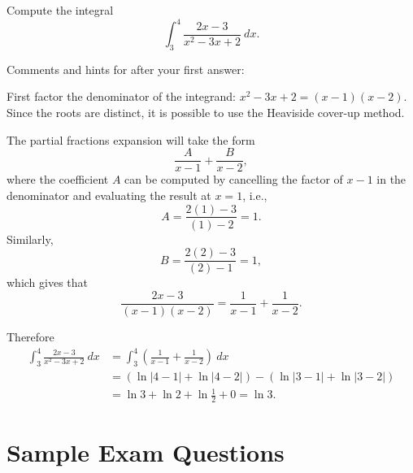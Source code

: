 \documentclass{ximera}
\begin{document}
\begin{question}%

Compute the integral
\[\int_{3}^{4}\frac{2x-3}{x^2-3x+2}~dx.\]
\begin{multiplechoice}
\end{multiplechoice}
Comments and hints for after your first answer:
\begin{feedback}
First factor the denominator of the integrand: \(x^2-3x+2 = (x-1)(x-2)\). Since the roots are distinct, it is possible to use the Heaviside cover-up method.  \begin{hint} The partial fractions expansion will take the form \[\frac{A}{x-1} + \frac{B}{x-2}, \] where the coefficient \(A\) can be computed by cancelling the factor of \(x-1\) in the denominator and evaluating the result at \(x = 1\), i.e., \[A = \frac{2(1)-3}{(1)-2} = 1. \] Similarly, \[B = \frac{2(2)-3}{(2)-1} = 1,\] which gives that \[\frac{2x-3}{(x-1)(x-2)} = \frac{1}{x-1} + \frac{1}{x-2}. \] \begin{hint} Therefore
\[ \begin{aligned} 
\int_{3}^{4}\frac{2x-3}{x^2-3x+2}~dx & = \int_{3}^{4}\left(\frac{1}{x-1} + \frac{1}{x-2}\right)~dx \\
 & = \left(\ln |4-1| + \ln |4-2| \right) - \left(\ln |3-1| + \ln |3-2| \right)\\
 & = \ln 3 + \ln 2 + \ln \frac{1}{2} + 0 = \ln 3.\end{aligned}\] \end{hint} \end{hint}
\end{feedback}

\end{question}

\section*{Sample Exam Questions}
\end{document}
